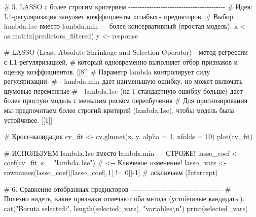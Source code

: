 \documentclass[
  letterpaper,
  DIV=11,
  numbers=noendperiod]{scrreprt}
\newenvironment{Shaded}{\begin{snugshade}}{\end{snugshade}}
\newcommand{\AttributeTok}[1]{\textcolor[rgb]{0.40,0.45,0.13}{#1}}
\newcommand{\CommentTok}[1]{\textcolor[rgb]{0.37,0.37,0.37}{#1}}
\newcommand{\DecValTok}[1]{\textcolor[rgb]{0.68,0.00,0.00}{#1}}
\newcommand{\FunctionTok}[1]{\textcolor[rgb]{0.28,0.35,0.67}{#1}}
\newcommand{\NormalTok}[1]{\textcolor[rgb]{0.00,0.23,0.31}{#1}}
\newcommand{\OtherTok}[1]{\textcolor[rgb]{0.00,0.23,0.31}{#1}}
\newcommand{\SpecialCharTok}[1]{\textcolor[rgb]{0.37,0.37,0.37}{#1}}
\newcommand{\StringTok}[1]{\textcolor[rgb]{0.13,0.47,0.30}{#1}}
\begin{document}
\begin{Shaded}
\begin{Highlighting}[]
\CommentTok{\# 5. LASSO с более строгим критерием {-}{-}{-}{-}{-}{-}{-}{-}{-}{-}{-}{-}{-}{-}{-}{-}{-}{-}{-}{-}{-}{-}{-}{-}{-}{-}{-}{-}{-}{-}{-}{-}{-}{-}{-}{-}{-}{-}{-}{-}{-}{-}}
\CommentTok{\# Идея: L1{-}регуляризация зануляет коэффициенты «слабых» предикторов.}
\CommentTok{\# Выбор lambda.1se вместо lambda.min — более консервативный (простая модель).}
\NormalTok{x }\OtherTok{\textless{}{-}} \FunctionTok{as.matrix}\NormalTok{(predictors\_filtered)}
\NormalTok{y }\OtherTok{\textless{}{-}}\NormalTok{ response}

\CommentTok{\# LASSO (Least Absolute Shrinkage and Selection Operator) {-} метод регрессии с L1{-}регуляризацией,}
\CommentTok{\# который одновременно выполняет отбор признаков и оценку коэффициентов. [[8]]}
\CommentTok{\# Параметр lambda контролирует силу регуляризации:}
\CommentTok{\#   {-} lambda.min дает наименьшую ошибку, но может включать шумовые переменные}
\CommentTok{\#   {-} lambda.1se (на 1 стандартную ошибку больше) дает более простую модель с меньшим риском переобучения}
\CommentTok{\# Для прогнозирования мы предпочитаем более строгий критерий (lambda.1se), чтобы модель была устойчивее. [[1]]}

\CommentTok{\# Кросс{-}валидация}
\NormalTok{cv\_fit }\OtherTok{\textless{}{-}} \FunctionTok{cv.glmnet}\NormalTok{(x, y, }\AttributeTok{alpha =} \DecValTok{1}\NormalTok{, }\AttributeTok{nfolds =} \DecValTok{10}\NormalTok{)}
\FunctionTok{plot}\NormalTok{(cv\_fit)}

\CommentTok{\# ИСПОЛЬЗУЕМ lambda.1se вместо lambda.min — СТРОЖЕ!}
\NormalTok{lasso\_coef }\OtherTok{\textless{}{-}} \FunctionTok{coef}\NormalTok{(cv\_fit, }\AttributeTok{s =} \StringTok{"lambda.1se"}\NormalTok{)  }\CommentTok{\# \textless{}{-}{-} Ключевое изменение!}
\NormalTok{lasso\_vars }\OtherTok{\textless{}{-}} \FunctionTok{rownames}\NormalTok{(lasso\_coef)[lasso\_coef[,}\DecValTok{1}\NormalTok{] }\SpecialCharTok{!=} \DecValTok{0}\NormalTok{][}\SpecialCharTok{{-}}\DecValTok{1}\NormalTok{]  }\CommentTok{\# исключаем (Intercept)}


\CommentTok{\# 6. Сравнение отобранных предикторов {-}{-}{-}{-}{-}{-}{-}{-}{-}{-}{-}{-}{-}{-}{-}{-}{-}{-}{-}{-}{-}{-}{-}{-}{-}{-}{-}{-}{-}{-}{-}{-}{-}{-}{-}{-}{-}{-}{-}{-}}
\CommentTok{\# Полезно видеть, какие признаки отмечают оба метода (устойчивые кандидаты).}
\FunctionTok{cat}\NormalTok{(}\StringTok{"Boruta selected:"}\NormalTok{, }\FunctionTok{length}\NormalTok{(selected\_vars), }\StringTok{"variables}\SpecialCharTok{\textbackslash{}n}\StringTok{"}\NormalTok{)}
\FunctionTok{print}\NormalTok{(selected\_vars)}


\end{Highlighting}
\end{Shaded}
\end{document}
